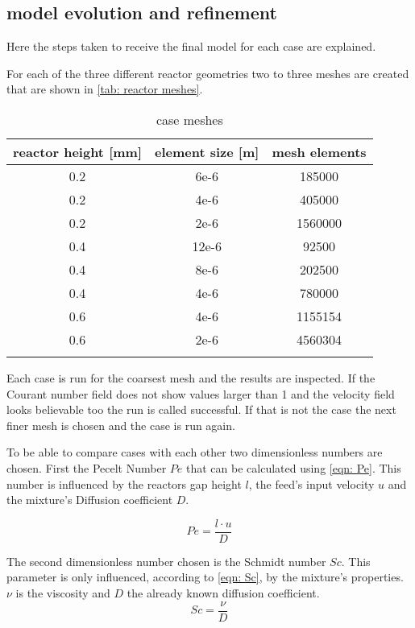 \documentclass[../thesis.tex]{subfiles}
\begin{document}
\subsection{model evolution and refinement}

Here the steps taken to receive the final model for each case are explained.

For each of the three different reactor geometries two to three meshes are created that are shown in \autoref{tab: reactor meshes}.

\begin{table} [htb]
	\centering
	\caption{case meshes}
	\begin{tabular}{ ccc }
		\hline
		reactor height [mm] & element size [m] & mesh elements \\
		\hline
		0.2 & 6e-6 & 185000\\
		0.2 & 4e-6 & 405000\\
		0.2 & 2e-6 & 1560000\\
		0.4 & 12e-6 & 92500\\
		0.4 & 8e-6 & 202500\\
		0.4 & 4e-6 & 780000\\
		0.6 & 4e-6 & 1155154\\
		0.6 & 2e-6 & 4560304\\
		\hline		
		\label{tab: reactor meshes}
	\end{tabular}
\end{table}

Each case is run for the coarsest mesh and the results are inspected. If the Courant number field does not show values larger than 1 and the velocity field looks believable too the run is called successful. If that is not the case the next finer mesh is chosen and the case is run again. 

To be able to compare cases with each other two dimensionless numbers are chosen. First the Pecelt Number $Pe$ that can be calculated using \autoref{eqn: Pe}. This number is influenced by the reactors gap height $l$, the feed's input velocity $u$ and the mixture's Diffusion coefficient $D$.

\begin{equation}
	\label{eqn: Pe}
	Pe = \dfrac{l \cdot u}{D}
\end{equation}

The second dimensionless number chosen is the Schmidt number $Sc$. This parameter is only influenced, according to \autoref{eqn: Sc}, by the mixture's properties. $\nu$ is the viscosity and $D$ the already known diffusion coefficient.
\begin{equation}
	\label{eqn: Sc}
	Sc = \dfrac{\nu}{D}
\end{equation}
\end{document}
